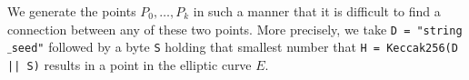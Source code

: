 We generate the points $P_0,\dots,P_{{k}}$ in such a manner that it is difficult to find a connection between any of these two points. 
More precisely, we take 
	\texttt{D =  "string$\_$seed"} 
followed by a byte 
	\texttt{S} 
holding that smallest number that 
	\texttt{H = Keccak256(D || S)} 
results in a point in the elliptic curve $E$. 
